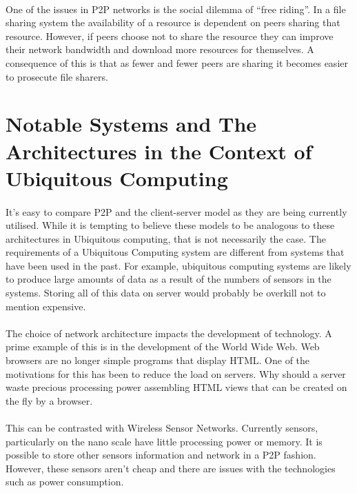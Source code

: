 \documentclass[11pt]{amsart}
\begin{document}
\paragraph{}
One of the issues in P2P networks is the social dilemma of ``free riding''. In a file sharing system the availability of a resource is dependent on peers sharing that resource. However, if peers choose not to share the resource they can improve their network bandwidth and download more resources for themselves. A consequence of this is that as fewer and fewer peers are sharing it becomes easier to prosecute file sharers. \cite{FreeRiding}



\section{Notable Systems and The Architectures in the Context of Ubiquitous Computing}
\paragraph{}
It's easy to compare P2P and the client-server model as they are being currently utilised. While it is tempting to believe these models to be analogous to these architectures in Ubiquitous computing, that is not necessarily the case. The requirements of a Ubiquitous Computing system are different from systems that have been used in the past. For example, ubiquitous computing systems are likely to produce large amounts of data as a result of the numbers of sensors in the systems. Storing all of this data on server would probably be overkill not to mention expensive.
\paragraph{}
The choice of network architecture impacts the development of technology. A prime example of this is in the development of the World Wide Web. Web browsers are no longer simple programs that display HTML. One of the motivations for this has been to reduce the load on servers. Why should a server waste precious processing power assembling HTML views that can be created on the fly by a browser.
\paragraph{}
This can be contrasted with Wireless Sensor Networks. Currently sensors, particularly on the nano scale have little processing power or memory. It is possible to store other sensors information and network in a P2P fashion. However, these sensors aren't cheap and there are issues with the technologies such as power consumption.
\end{document}
